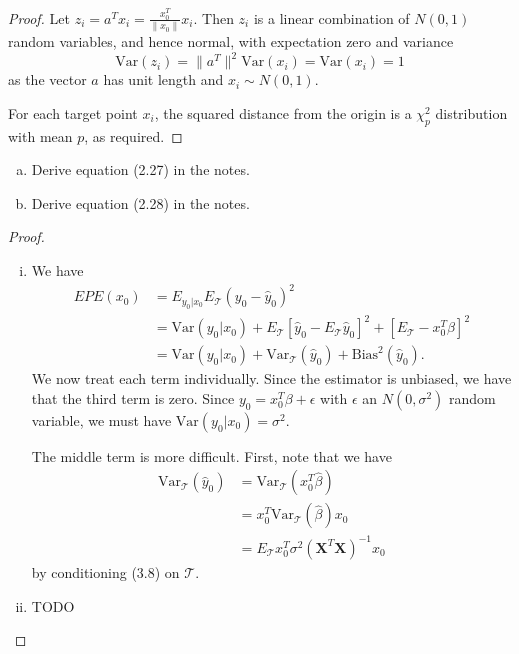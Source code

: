 \begin{proof}
    Let $z_i = a^T x_i = \frac{x_0^T}{\| x_0 \|} x_i$.  Then $z_i$ is a linear combination of $N(0,1)$ random variables, and hence normal, with expectation zero and variance \[ 
        \text{Var}(z_i) = \| a^T \|^2 \text{Var}(x_i) = \text{Var}(x_i) = 1
    \] as the vector $a$ has unit length and $x_i \sim N(0, 1)$.
    
    For each target point $x_i$, the squared distance from the origin is a $\chi^2_p$ distribution with mean $p$, as required.  
\end{proof}

\begin{exer}
    \begin{enumerate}[(a)]
        \item Derive equation (2.27) in the notes.
        \item Derive equation (2.28) in the notes.
    \end{enumerate}
\end{exer}

\begin{proof}
    \begin{enumerate}[(i)]
        \item We have \begin{align*}
            EPE(x_0) &= E_{y_0 | x_0} E_{\mathcal{T}}(y_0 - \hat y_0)^2 \\
                     &= \text{Var}(y_0|x_0) + E_{\mathcal T}[\hat y_0 - E_{\mathcal T} \hat y_0]^2 + [E_{\mathcal T} - x_0^T \beta]^2 \\
                     &= \text{Var}(y_0 | x_0) + \text{Var}_\mathcal{T}(\hat y_0) + \text{Bias}^2(\hat y_0).
        \end{align*}  We now treat each term individually.  Since the estimator is unbiased, we have that the third term is zero.  Since $y_0 = x_0^T \beta + \epsilon$ with $\epsilon$ an $N(0,\sigma^2)$ random variable, we must have $\text{Var}(y_0|x_0) = \sigma^2$.  

        The middle term is more difficult.  First, note that we have \begin{align*}
            \text{Var}_{\mathcal T}(\hat y_0) &= \text{Var}_{\mathcal T}(x_0^T \hat \beta) \\
                    &= x_0^T \text{Var}_{\mathcal T}(\hat \beta) x_0 \\
                    &= E_{\mathcal T} x_0^T \sigma^2 (\mathbf{X}^T \mathbf{X})^{-1} x_0
            \end{align*} by conditioning (3.8) on $\mathcal T$.
        \item TODO
    \end{enumerate}
\end{proof}

